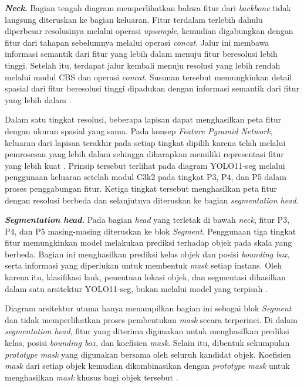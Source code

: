 \noindent\textbf{\textit{Neck}.}
Bagian tengah diagram memperlihatkan bahwa fitur dari \textit{backbone} tidak langsung diteruskan ke bagian keluaran. Fitur terdalam terlebih dahulu diperbesar resolusinya melalui operasi \textit{upsample}, kemudian digabungkan dengan fitur dari tahapan sebelumnya melalui operasi \textit{concat}. Jalur ini membawa informasi semantik dari fitur yang lebih dalam menuju fitur beresolusi lebih tinggi. Setelah itu, terdapat jalur kembali menuju resolusi yang lebih rendah melalui modul CBS dan operasi \textit{concat}. Susunan tersebut memungkinkan detail spasial dari fitur beresolusi tinggi dipadukan dengan informasi semantik dari fitur yang lebih dalam \cite{khanam2024,qiu2025}.

Dalam satu tingkat resolusi, beberapa lapisan dapat menghasilkan peta fitur dengan ukuran spasial yang sama. Pada konsep \textit{Feature Pyramid Network}, keluaran dari lapisan terakhir pada setiap tingkat dipilih karena telah melalui pemrosesan yang lebih dalam sehingga diharapkan memiliki representasi fitur yang lebih kuat \cite{lin2017fpn}. Prinsip tersebut terlihat pada diagram YOLO11-seg melalui penggunaan keluaran setelah modul C3k2 pada tingkat P3, P4, dan P5 dalam proses penggabungan fitur. Ketiga tingkat tersebut menghasilkan peta fitur dengan resolusi berbeda dan selanjutnya diteruskan ke bagian \textit{segmentation head}.

\noindent\textbf{\textit{Segmentation head}.}
Pada bagian \textit{head} yang terletak di bawah \textit{neck}, fitur P3, P4, dan P5 masing-masing diteruskan ke blok \textit{Segment}. Penggunaan tiga tingkat fitur memungkinkan model melakukan prediksi terhadap objek pada skala yang berbeda. Bagian ini menghasilkan prediksi kelas objek dan posisi \textit{bounding box}, serta informasi yang diperlukan untuk membentuk \textit{mask} setiap instans. Oleh karena itu, klasifikasi lauk, penentuan lokasi objek, dan segmentasi dihasilkan dalam satu arsitektur YOLO11-seg, bukan melalui model yang terpisah \cite{qiu2025}.

Diagram arsitektur utama hanya menampilkan bagian ini sebagai blok
\textit{Segment} dan tidak memperlihatkan proses pembentukan \textit{mask}
secara terperinci. Di dalam \textit{segmentation head}, fitur yang diterima
digunakan untuk menghasilkan prediksi kelas, posisi \textit{bounding box},
dan koefisien \textit{mask}. Selain itu, dibentuk sekumpulan
\textit{prototype mask} yang digunakan bersama oleh seluruh kandidat objek.
Koefisien \textit{mask} dari setiap objek kemudian dikombinasikan dengan
\textit{prototype mask} untuk menghasilkan \textit{mask} khusus bagi objek
tersebut \cite{bolya2019yolact,qiu2025}.

